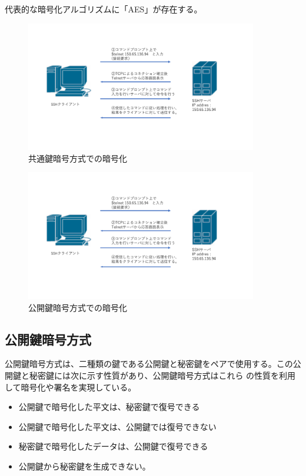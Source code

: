 \documentclass[11pt,a4j,titlepage]{jreport}
\begin{document}
代表的な暗号化アルゴリズムに「AES」が存在する。

\afterpage{\clearpage}
\newpage

\begin{figure}[h]
    \centering
    \includegraphics[width=0.9\textwidth, page=8]{graphs/network_archtecture.pdf}
    \caption{共通鍵暗号方式での暗号化}
    \label{shared_key}
\end{figure}

\begin{figure}[h]
    \centering
    \includegraphics[width=0.9\textwidth, page=9]{graphs/network_archtecture.pdf}
    \caption{公開鍵暗号方式での暗号化}
    \label{public_key}
\end{figure}


\afterpage{\clearpage}
\newpage
\subsection{公開鍵暗号方式}
公開鍵暗号方式は、二種類の鍵である公開鍵と秘密鍵をペアで使用する。この公開鍵と秘密鍵には次に示す性質があり、公開鍵暗号方式はこれら
の性質を利用して暗号化や署名を実現している。
\begin{itemize}
    \item 公開鍵で暗号化した平文は、秘密鍵で復号できる
    \item 公開鍵で暗号化した平文は、公開鍵では復号できない
    \item 秘密鍵で暗号化したデータは、公開鍵で復号できる
    \item 公開鍵から秘密鍵を生成できない。
\end{itemize}
\end{document}
